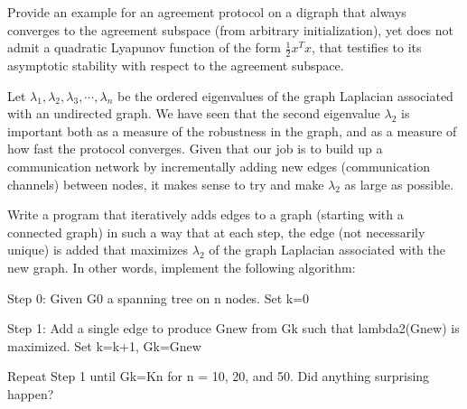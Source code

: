 \documentclass{article}
\begin{document}
\begin{problem}
    Provide an example for an agreement protocol on a digraph that always converges to the agreement subspace (from arbitrary initialization), yet does not admit a quadratic Lyapunov function of the form $\frac{1}{2} x^T x$, that testiﬁes to its asymptotic stability with respect to the agreement subspace.
\end{problem}
\begin{problem}
Let $\lambda_1, \lambda_2, \lambda_3, \cdots, \lambda_n $ be the ordered eigenvalues of the graph Laplacian associated with an undirected graph. We have seen that the second eigenvalue $\lambda_2$ is important both as a measure of the robustness in the graph, and as a measure of how fast the protocol converges. Given that our job is to build up a communication network by incrementally adding new edges (communication channels) between nodes, it makes sense to try and make $\lambda_2$ as large as possible.
    
Write a program that iteratively adds edges to a graph (starting with a connected graph) in such a way that at each step, the edge (not necessarily unique) is added that maximizes $\lambda_2$ of the graph Laplacian associated with the new graph. In other words, implement the following algorithm: 

Step 0: Given G0 a spanning tree on n nodes. Set k=0

Step 1: Add a single edge to produce Gnew from Gk such that lambda2(Gnew) is maximized. Set k=k+1, Gk=Gnew

Repeat Step 1 until Gk=Kn for n = 10, 20, and 50. Did anything surprising happen?
\end{problem}
\end{document}
